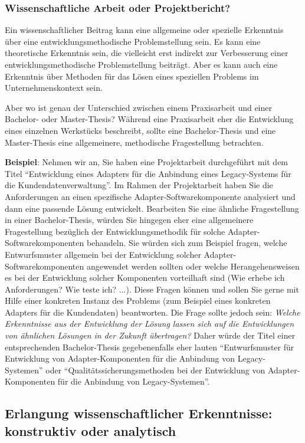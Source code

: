 \subsubsection{Wissenschaftliche Arbeit oder Projektbericht?}

Ein wissenschaftlicher Beitrag kann eine allgemeine oder spezielle Erkenntnis über eine entwicklungsmethodische Problemstellung sein. Es kann eine theoretische Erkenntnis sein, die vielleicht erst indirekt zur Verbesserung einer entwicklungsmethodische Problemstellung beiträgt. Aber es kann auch eine Erkenntnis über Methoden für das Lösen eines speziellen Problems im Unternehmenskontext sein.

Aber wo ist genau der Unterschied zwischen einem Praxisarbeit und einer Bachelor- oder Master-Thesis? Während eine Praxisarbeit eher die Entwicklung eines einzelnen Werkstücks beschreibt, sollte eine Bachelor-Thesis und eine Master-Thesis eine allgemeinere, methodische Fragestellung betrachten. 

\textbf{Beispiel}: Nehmen wir an, Sie haben eine Projektarbeit durchgeführt mit dem Titel \enquote{Entwicklung eines Adapters für die Anbindung eines Legacy-Systems für die Kundendatenverwaltung}. Im Rahmen der Projektarbeit haben Sie die Anforderungen an einen spezifische Adapter-Softwarekomponente analysiert und dann eine passende Lösung entwickelt. Bearbeiten Sie eine ähnliche Fragestellung in einer Bachelor-Thesis, würden Sie hingegen eher eine allgemeinere Fragestellung bezüglich der Entwicklungsmethodik für solche Adapter-Softwarekomponenten behandeln. Sie würden sich zum Beispiel fragen, welche Entwurfsmuster  allgemein bei der Entwicklung solcher Adapter-Softwarekomponenten angewendet werden sollten oder welche Herangehensweisen es bei der Entwicklung solcher Komponenten vorteilhaft sind (Wie erhebe ich Anforderungen? Wie teste ich? ...). Diese Fragen können und sollen Sie gerne mit Hilfe einer konkreten Instanz des Problems (zum Beispiel eines konkreten Adapters für die Kundendaten) beantworten. Die Frage sollte jedoch sein: \textit{Welche Erkenntnisse aus der Entwicklung der Lösung lassen sich auf die Entwicklungen von ähnlichen Lösungen in der Zukunft übertragen?} Daher würde der Titel einer entsprechenden Bachelor-Thesis gegebenenfalls eher lauten \enquote{Entwurfsmuster für Entwicklung von Adapter-Komponenten für die Anbindung von Legacy-Systemen} oder \enquote{Qualitätssicherungsmethoden bei der Entwicklung von Adapter-Komponenten für die Anbindung von Legacy-Systemen}.

\subsection{Erlangung wissenschaftlicher Erkenntnisse: konstruktiv oder analytisch}

